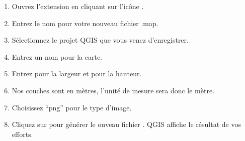 

\begin{enumerate}
  \item Ouvrez l'extension en cliquant sur l'ic\^one .
  \item Entrez le nom  pour votre nouveau fichier .map.
  \item S\'electionnez le projet QGIS  que vous venez d'enregistrer.
  \item Entrez un nom  pour la carte.
  \item Entrez  pour la largeur et  pour la hauteur.
  \item Nos couches sont en m\`etres, l'unit\'e de mesure sera donc le m\`etre.
  \item Choisissez ``png'' pour le type d'image.
  \item Cliquez sur  pour g\'en\'erer le ouveau fichier . 
  QGIS affiche le r\'esultat de vos efforts.
\end{enumerate}

